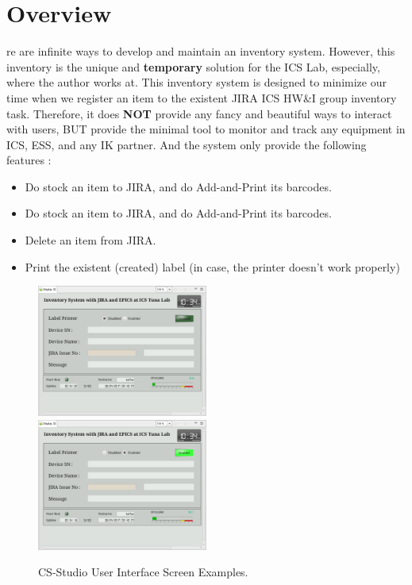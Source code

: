 \documentclass[11pt
  , a4paper
  , article
  , oneside
  , showtrims
]{memoir}
\begin{document}
\chapter{Overview}
re are infinite ways to develop and maintain an inventory system. However, this inventory is the unique and \textbf{temporary} solution for the ICS Lab, especially, where the author works at. This inventory system is designed to minimize our time when we register an item to the existent JIRA ICS HW\&I group inventory task. Therefore, it does \textbf{NOT} provide any fancy and beautiful ways to interact with users, BUT provide the minimal tool to monitor and track any equipment in ICS, ESS, and any IK partner. And the system only provide the following features :
\begin{itemize}
\item Do stock an item to JIRA, and do Add-and-Print its barcodes.
\item Do stock an item to JIRA, and do Add-and-Print its barcodes.
\item Delete an item from JIRA.
\item Print the existent (created) label (in case, the printer doesn't work properly)
\end{itemize}


\begin{figure}[!htb]
  \includegraphics[width=0.5\textwidth]{./pictures/inv01.eps}
  \includegraphics[width=0.5\textwidth]{./pictures/inv02.eps}
  \caption{
            CS-Studio User Interface Screen Examples.
          }
  \label{fig:css-examples}   
\end{figure}
\end{document}

